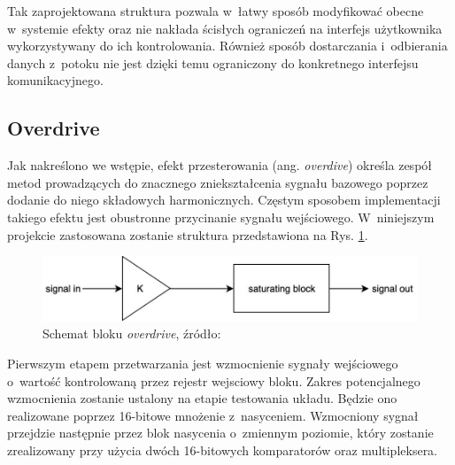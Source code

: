 Tak zaprojektowana struktura pozwala w~łatwy sposób modyfikować obecne w~systemie efekty oraz nie nakłada ścisłych ograniczeń na interfejs użytkownika wykorzystywany do ich kontrolowania. Również sposób dostarczania i~odbierania danych z~potoku nie jest dzięki temu ograniczony do konkretnego interfejsu komunikacyjnego.


\subsection{Overdrive}

Jak nakreślono we wstępie, efekt przesterowania (ang. \textit{overdive}) określa zespół metod prowadzących do znacznego zniekształcenia sygnału bazowego poprzez dodanie do niego składowych harmonicznych. Częstym sposobem implementacji takiego efektu jest obustronne przycinanie sygnału wejściowego. W~niniejszym projekcie zastosowana zostanie struktura przedstawiona na Rys. \ref{effects-overdrive}.

\vspace{0.5cm}
\begin{figure}[ht]
    \centering
    \includegraphics[scale=0.4]{img/theoretical-analysis/overdrive.jpg}
    \captionsetup{format=plain,justification=centering}
    \caption{Schemat bloku \textit{overdrive}, źródło: \cite{fpga_pedal}}
    \label{effects-overdrive}
\end{figure}
\vspace{0.5cm}

Pierwszym etapem przetwarzania jest wzmocnienie sygnały wejściowego o~wartość kontrolowaną przez rejestr wejsciowy bloku. Zakres potencjalnego wzmocnienia zostanie ustalony na etapie testowania układu. Będzie ono realizowane poprzez 16-bitowe mnożenie z~nasyceniem. Wzmocniony sygnał przejdzie następnie przez blok nasycenia o~zmiennym poziomie, który zostanie zrealizowany przy użycia dwóch 16-bitowych komparatorów oraz multipleksera.


